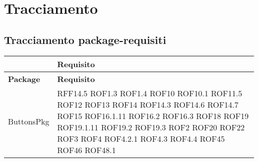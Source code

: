 \newpage

\section{Tracciamento}

	\subsection{Tracciamento package-requisiti}
	\def\arraystretch{1.5}
	\begin{longtable}{p{5cm}!{\VRule[1pt]}p{2.5cm}}
		\color{white} \textbf{} & \color{white} \textbf{Requisito} \\ 
		\endfirsthead
		\color{white} \textbf{Package} & \color{white} \textbf{Requisito} \\ 
		\endhead
		ButtonsPkg & RFF14.5 \newline ROF1.3 \newline ROF1.4 \newline ROF10 \newline ROF10.1 \newline ROF11.5 \newline ROF12 \newline ROF13 \newline ROF14 \newline ROF14.3 \newline ROF14.6 \newline ROF14.7 \newline ROF15 \newline ROF16.1.11 \newline ROF16.2 \newline ROF16.3 \newline ROF18 \newline ROF19 \newline ROF19.1.11 \newline ROF19.2 \newline ROF19.3 \newline ROF2 \newline ROF20 \newline ROF22 \newline ROF3 \newline ROF4 \newline ROF4.2.1 \newline ROF4.3 \newline ROF4.4 \newline ROF45 \newline ROF46 \newline ROF48.1 \\

\end{longtable}

